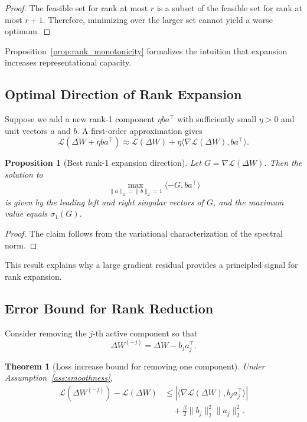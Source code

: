 \documentclass{article}
\newtheorem{theorem}{Theorem}
\newtheorem{proposition}{Proposition}[section]
\begin{document}
\begin{proof}
The feasible set for rank at most $r$ is a subset of the feasible set for rank at most $r+1$. Therefore, minimizing over the larger set cannot yield a worse optimum.
\end{proof}

Proposition~\ref{prop:rank_monotonicity} formalizes the intuition that expansion increases representational capacity.

\subsection{Optimal Direction of Rank Expansion}
Suppose we add a new rank-1 component $\eta ba^\top$ with sufficiently small $\eta > 0$ and unit vectors $a$ and $b$. A first-order approximation gives
\begin{equation}
    \mathcal{L}(\Delta W + \eta ba^\top)
    \approx
    \mathcal{L}(\Delta W) + \eta\langle \nabla\mathcal{L}(\Delta W), ba^\top \rangle.
\end{equation}

\begin{proposition}[Best rank-1 expansion direction]
\label{prop:best_rank1_direction}
Let $G = \nabla \mathcal{L}(\Delta W)$. Then the solution to
\begin{equation}
    \max_{\|a\|_2 = \|b\|_2 = 1} \langle -G, ba^\top \rangle
\end{equation}
is given by the leading left and right singular vectors of $G$, and the maximum value equals $\sigma_1(G)$.
\end{proposition}

\begin{proof}
The claim follows from the variational characterization of the spectral norm.
\end{proof}

This result explains why a large gradient residual provides a principled signal for rank expansion.

\subsection{Error Bound for Rank Reduction}
Consider removing the $j$-th active component so that
\begin{equation}
    \Delta W^{(-j)} = \Delta W - b_j a_j^\top.
\end{equation}

\begin{theorem}[Loss increase bound for removing one component]
\label{thm:pruning_bound}
Under Assumption~\ref{ass:smoothness},
\begin{equation}
\label{eq:pruning_bound}
\begin{aligned}
    \mathcal{L}(\Delta W^{(-j)}) - \mathcal{L}(\Delta W)
    &\le \left|\langle \nabla\mathcal{L}(\Delta W), b_j a_j^\top \rangle\right| \\
    &\quad + \frac{\beta}{2}\|b_j\|_2^2\|a_j\|_2^2.
\end{aligned}
\end{equation}
\end{theorem}
\end{document}
